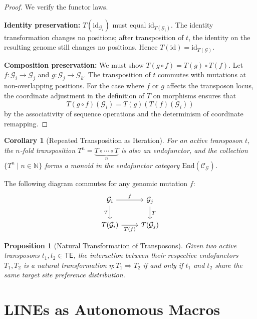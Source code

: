 \documentclass[12pt,a4paper]{article}
\newtheorem{proposition}[theorem]{Proposition}
\newtheorem{corollary}[theorem]{Corollary}
\newcommand{\Genome}{\mathcal{G}}
\newcommand{\TE}{\mathsf{TE}}
\newcommand{\id}{\mathrm{id}}
\begin{document}
\begin{proof}
We verify the functor laws.

\textbf{Identity preservation:} $T(\id_{\Genome_i})$ must equal $\id_{T(\Genome_i)}$.
The identity transformation changes no positions; after transposition of $t$, the identity
on the resulting genome still changes no positions. Hence $T(\id) = \id_{T(\Genome)}$.

\textbf{Composition preservation:} We must show $T(g \circ f) = T(g) \circ T(f)$.
Let $f : \Genome_i \to \Genome_j$ and $g : \Genome_j \to \Genome_k$. The transposition
of $t$ commutes with mutations at non-overlapping positions. For the case where $f$ or
$g$ affects the transposon locus, the coordinate adjustment in the definition of $T$
on morphisms ensures that
\[
  T(g \circ f)(\Genome_i) = T(g)(T(f)(\Genome_i))
\]
by the associativity of sequence operations and the determinism of coordinate remapping.
\end{proof}

\begin{corollary}[Repeated Transposition as Iteration]\label{cor:iteration}
For an active transposon $t$, the $n$-fold transposition $T^n = \underbrace{T \circ \cdots \circ T}_{n}$
is also an endofunctor, and the collection $\{T^n \mid n \in \mathbb{N}\}$ forms a
monoid in the endofunctor category $\mathrm{End}(\mathcal{C}_\Genome)$.
\end{corollary}

The following diagram commutes for any genomic mutation $f$:
\[
\begin{tikzcd}
  \Genome_i \arrow[r, "f"] \arrow[d, "T"'] & \Genome_j \arrow[d, "T"] \\
  T(\Genome_i) \arrow[r, "T(f)"'] & T(\Genome_j)
\end{tikzcd}
\]

\begin{proposition}[Natural Transformation of Transposons]\label{prop:nat-trans}
Given two active transposons $t_1, t_2 \in \TE$, the interaction between their
respective endofunctors $T_1, T_2$ is a natural transformation
$\eta : T_1 \Rightarrow T_2$ if and only if $t_1$ and $t_2$ share the same target
site preference distribution.
\end{proposition}


\section{LINEs as Autonomous Macros}\label{sec:lines}
\end{document}
